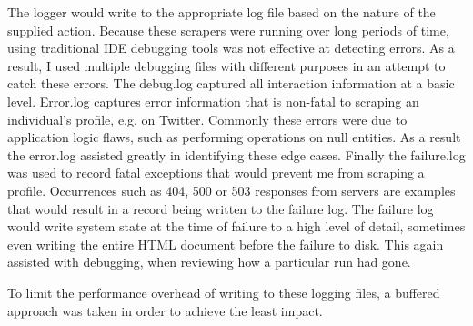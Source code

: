 The logger would write to the appropriate log file based on the nature of the supplied action. Because these scrapers were running over long periods of time, using traditional IDE debugging tools was not effective at detecting errors. As a result, I used multiple debugging files with different purposes in an attempt to catch these errors. The debug.log captured all interaction information at a basic level. Error.log captures error information that is non-fatal to scraping an individual's profile, e.g. on Twitter. Commonly these errors were due to application logic flaws, such as performing operations on null entities. As a result the error.log assisted greatly in identifying these edge cases. Finally the failure.log was used to record fatal exceptions that would prevent me from scraping a profile. Occurrences such as 404, 500 or 503 responses from servers are examples that would result in a record being written to the failure log. The failure log would write system state at the time of failure to a high level 
of detail, sometimes even writing the entire HTML document before the failure to disk. This again assisted with debugging, when reviewing how a particular run had gone. 

To limit the performance overhead of writing to these logging files, a buffered approach was taken in order to achieve the least impact. %
